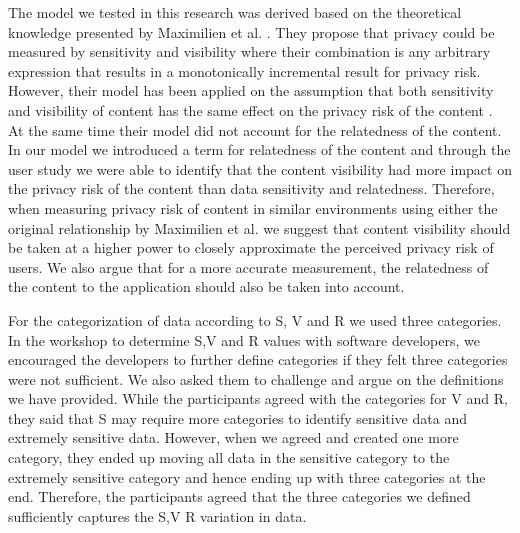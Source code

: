 \documentclass[10pt]{article}
\begin{document}
The model we tested in this research was derived based on the theoretical knowledge presented by Maximilien et al. \cite {maximilien2009privacy}. They propose that privacy could be measured by sensitivity and visibility where their combination is any arbitrary expression that results in a monotonically incremental result for privacy risk. However, their model has been applied on the assumption that both sensitivity and visibility of content has the same effect on the privacy risk of the content \cite{minkus2014scale}. At the same time their model did not account for the relatedness of the content. In our model we introduced a term for relatedness of the content and through the user study we were able to identify that the content visibility had more impact on the privacy risk of the content than data sensitivity and relatedness. Therefore, when measuring privacy risk of content in similar environments using either the original relationship by Maximilien et al. \cite {maximilien2009privacy} we suggest that content visibility should be taken at a higher power to closely approximate the perceived privacy risk of users. We also argue that for a more accurate measurement, the relatedness of the content to the application should also be taken into account. 

For the categorization of data according to S, V and R we used three categories. In the workshop to determine S,V and R values with software developers, we encouraged the developers to further define categories if they felt three categories were not sufficient. We also asked them to challenge and argue on the definitions we have provided. While the participants agreed with the categories for V and R, they said that S may require more categories to identify sensitive data and extremely sensitive data. However, when we agreed and created one more category, they ended up moving all data in the sensitive category to the extremely sensitive category and hence ending up with three categories at the end. Therefore, the participants agreed that the three categories we defined sufficiently captures the S,V R variation in data.
\end{document}
